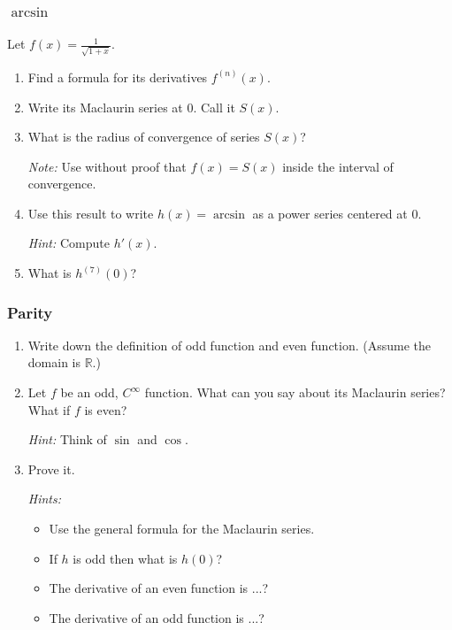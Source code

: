 \begin{frame}[t]
	\frametitle{$\arcsin$}

	Let $\displaystyle f(x)=\frac{1}{\sqrt{1+x}}$.
	\begin{enumerate}
		\item Find a formula for its derivatives $\displaystyle f^{(n)}(x)$.
			\vspace{.2cm}

		\item Write its Maclaurin series at $0$. Call it $S(x)$.
			\vspace{.2cm}

		\item What is the radius of convergence of series $S(x)$?

			{\fontsize{12}{12}\selectfont \emph{Note:} Use without proof that $\displaystyle f(x)=S(x)$ inside the interval of convergence. }
			\vspace{.2cm}

		\item Use this result to write $h(x) = \arcsin$ as a power series centered at
			$0$.

			{\fontsize{12}{12}\selectfont \emph{Hint:} Compute $\displaystyle h'(x)$. }
			\vspace{.2cm}

		\item What is $\displaystyle h^{(7)}(0)$?
	\end{enumerate}
\end{frame}

\begin{frame}[t]
	\fontsize{13}{13}\selectfont
	\frametitle{Parity}

	\begin{enumerate}
		\item Write down the definition of odd function and even function. (Assume the
			domain is $\mathbb{R}$.)
			\vspace{.2cm}

		\item Let $f$ be an odd, $C^{\infty}$ function. What can you say about its Maclaurin
			series? What if $f$ is even?
			\vspace{.2cm}

			\emph{Hint:} Think of $\sin$ and $\cos$.
			\vspace{.2cm}

		\item Prove it.
			\vspace{.2cm}

			\emph{Hints:}
			\begin{itemize}
				\item Use the general formula for the Maclaurin series.

				\item If $h$ is odd then what is $h(0)$?

				\item The derivative of an even function is ...?

				\item The derivative of an odd function is ...?
			\end{itemize}
	\end{enumerate}
\end{frame}

